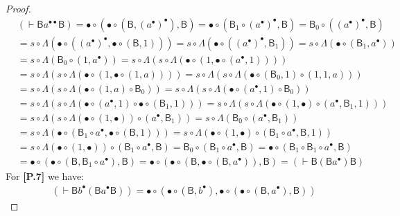 \documentclass{llncs}
\begin{document}
\begin{proof}
\begin{align*}
  & (\vdash \mathsf{B}a^{\bullet\bullet}\mathsf{B})
    = \bullet \circ (\bullet \circ (\mathsf{B},(a^\bullet)^\bullet),\mathsf{B})
    = \bullet \circ (\mathsf{B}_1 \circ (a^\bullet)^\bullet,\mathsf{B})
    = \mathsf{B}_0 \circ ((a^\bullet)^\bullet,\mathsf{B})
  \\&= s \circ \Lambda(\bullet \circ ((a^\bullet)^\bullet,\bullet \circ (\mathsf{B},1)))
  = s \circ \Lambda(\bullet \circ ((a^\bullet)^\bullet,\mathsf{B}_1))
  = s \circ \Lambda(\bullet \circ (\mathsf{B}_1,a^\bullet))
  \\&= s \circ \Lambda(\mathsf{B}_0 \circ (1,a^\bullet))
  = s \circ \Lambda(s \circ \Lambda( \bullet \circ (1,\bullet \circ (a^\bullet,1))))
  \\&= s \circ \Lambda(s \circ \Lambda( \bullet \circ (1,\bullet \circ (1,a))))
  = s \circ \Lambda(s \circ \Lambda( \bullet \circ (\mathsf{B}_0,1) \circ (1,1,a)))
  \\&= s \circ \Lambda(s \circ \Lambda( \bullet \circ (1,a) \circ \mathsf{B}_0))
  = s \circ \Lambda(s \circ \Lambda( \bullet \circ (a^\bullet,1) \circ \mathsf{B}_0))
  \\&= s \circ \Lambda(s \circ \Lambda( \bullet \circ (a^\bullet,1) \circ \bullet \circ (\mathsf{B}_1,1)))
  = s \circ \Lambda(s \circ \Lambda( \bullet \circ (1,\bullet) \circ (a^\bullet,\mathsf{B}_1,1)))
  \\&= s \circ \Lambda(s \circ \Lambda(\bullet \circ (1,\bullet)) \circ (a^\bullet,\mathsf{B}_1))
  = s \circ \Lambda(\mathsf{B_0} \circ (a^\bullet,\mathsf{B}_1))
  \\&= s \circ \Lambda(\bullet \circ (\mathsf{B}_1 \circ a^\bullet,\bullet \circ (\mathsf{B},1)))
  = s \circ \Lambda(\bullet \circ (1,\bullet) \circ (\mathsf{B}_1 \circ a^\bullet,\mathsf{B},1))
  \\&= s \circ \Lambda(\bullet \circ (1,\bullet)) \circ (\mathsf{B}_1 \circ a^\bullet,\mathsf{B})
  = \mathsf{B}_0 \circ (\mathsf{B}_1 \circ a^\bullet,\mathsf{B})
  = \bullet \circ (\mathsf{B}_1 \circ \mathsf{B}_1 \circ a^\bullet,\mathsf{B})
  \\&= \bullet \circ (\bullet \circ (\mathsf{B},\mathsf{B}_1 \circ a^\bullet),\mathsf{B})
  = \bullet \circ (\bullet \circ (\mathsf{B},\bullet \circ (\mathsf{B}, a^\bullet)),\mathsf{B})
  = (\vdash \mathsf{B}(\mathsf{B}a^\bullet)\mathsf{B})
\end{align*}
For {\bf [P.7]} we have:
\begin{align*}
  & (\vdash \mathsf{B}b^\bullet(\mathsf{B}a^\bullet\mathsf{B}))
    = \bullet \circ (\bullet \circ (\mathsf{B},b^\bullet), \bullet \circ (\bullet \circ (\mathsf{B},a^\bullet), \mathsf{B}))

\end{align*}
\end{proof}
\end{document}

